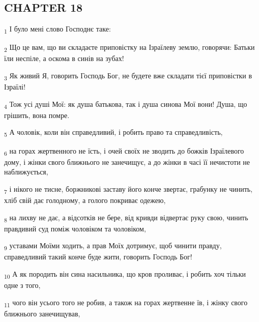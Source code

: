 \subsection{CHAPTER 18}
\begin{tcolorbox}
\textsubscript{1} І було мені слово Господнє таке:
\end{tcolorbox}
\begin{tcolorbox}
\textsubscript{2} Що це вам, що ви складаєте приповістку на Ізраїлеву землю, говорячи: Батьки їли неспіле, а оскома в синів на зубах!
\end{tcolorbox}
\begin{tcolorbox}
\textsubscript{3} Як живий Я, говорить Господь Бог, не будете вже складати тієї приповістки в Ізраїлі!
\end{tcolorbox}
\begin{tcolorbox}
\textsubscript{4} Тож усі душі Мої: як душа батькова, так і душа синова Мої вони! Душа, що грішить, вона помре.
\end{tcolorbox}
\begin{tcolorbox}
\textsubscript{5} А чоловік, коли він справедливий, і робить право та справедливість,
\end{tcolorbox}
\begin{tcolorbox}
\textsubscript{6} на горах жертвенного не їсть, і очей своїх не зводить до божків Ізраїлевого дому, і жінки свого ближнього не занечищує, а до жінки в часі її нечистоти не наближується,
\end{tcolorbox}
\begin{tcolorbox}
\textsubscript{7} і нікого не тисне, боржникові заставу його конче звертає, грабунку не чинить, хліб свій дає голодному, а голого покриває одежею,
\end{tcolorbox}
\begin{tcolorbox}
\textsubscript{8} на лихву не дає, а відсотків не бере, від кривди відвертає руку свою, чинить правдивий суд поміж чоловіком та чоловіком,
\end{tcolorbox}
\begin{tcolorbox}
\textsubscript{9} уставами Моїми ходить, а прав Моїх дотримує, щоб чинити правду, справедливий такий конче буде жити, говорить Господь Бог!
\end{tcolorbox}
\begin{tcolorbox}
\textsubscript{10} А як породить він сина насильника, що кров проливає, і робить хоч тільки одне з того,
\end{tcolorbox}
\begin{tcolorbox}
\textsubscript{11} чого він усього того не робив, а також на горах жертвенне їв, і жінку свого ближнього занечищував,
\end{tcolorbox}
